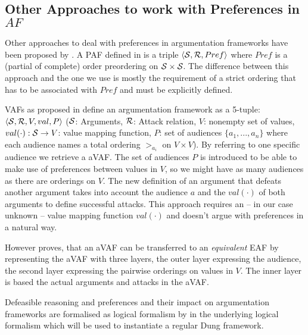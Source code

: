 \subsection{Other Approaches to work with Preferences in $AF$}
\label{sub:paf}
Other approaches to deal with preferences in argumentation frameworks have been proposed by \cite{amgoud,amgoud1998,Bench2003,pollock1987, prakken1997}. A \gls{PAF} defined in \cite{amgoud1998} is  a triple $\langle \S, \R, Pref \rangle$ where $Pref$ is a (partial of complete) order preordering on $\S \times \S$. The difference between this approach and the one we use is mostly the requirement of a strict ordering that has to be associated with $Pref$ and must be explicitly defined.
\label{sub:vaf}

\glspl{VAF} as proposed in \cite{Bench2003} define an argumentation framework as a 5-tuple: $\langle \S, \R, V, val, P \rangle$ ($\S$: Arguments, $\R$: Attack relation, $V$: nonempty set of values, $val(\cdot): \S \rightarrow V$: value mapping function, $P$: set of audiences $\{a_1, ..., a_n\}$ where each audience names a total ordering $>_{a_i}$ on $V \times V$). By referring to one specific audience we retrieve a \gls{aVAF}. The set of audiences $P$ is introduced to be able to make use of preferences between values in $V$, so we might have as many audiences as there are orderings on $V$. The new definition of an argument that defeats another argument takes into account the audience $a$ and the $val(\cdot)$ of both arguments to define successful attacks. This approach requires an -- in our case unknown -- value mapping function $val(\cdot)$ and doesn't argue with preferences in a natural way. 

However \cite{Modgil2009} proves, that an \gls{aVAF} can be transferred to an \textit{equivalent} \gls{EAF} by representing the \gls{aVAF} with three layers, the outer layer expressing the audience, the second layer expressing the pairwise orderings on values in $V$. The inner layer is based the actual arguments and attacks in the \gls{aVAF}.

Defeasible reasoning and preferences and their impact on argumentation frameworks are formalised as logical formalism by \cite{pollock1987, prakken1997} in the underlying logical formalism which will be used to instantiate a regular Dung framework.